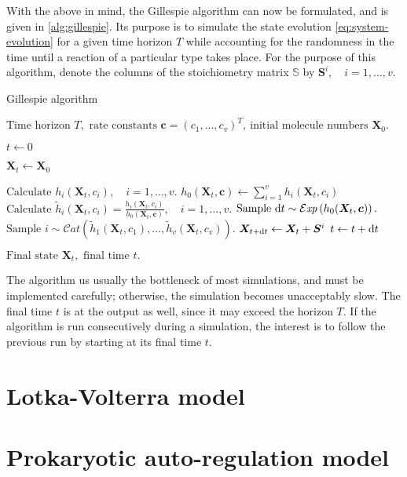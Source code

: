With the above in mind, the Gillespie algorithm can now be formulated, and is given in \autoref{alg:gillespie}. Its purpose is to simulate the state evolution \eqref{eq:system-evolution} for a given time horizon $T$ while accounting for the randomness in the time until a reaction of a particular type takes place. For the purpose of this algorithm, denote the columns of the stoichiometry matrix $\mathbb{S}$ by $\bm{S}^i, \quad i = 1, \ldots, v$.
\begin{algorithm}[ht]
    \caption{Gillespie algorithm}
    \label{alg:gillespie}
    \begin{algorithmic}[1]
        \Input $\text{Time horizon } T, \text{ rate constants } \bm{c} = \left(c_1, \ldots, c_v\right)^T,\ \text{initial molecule numbers } \bm{X}_0.$
        
        \State $t \gets 0$
        
        \State $\bm{X}_t \gets \bm{X}_0$
        
            \State $\text{Calculate } h_i(\bm{X}_t, c_i), \quad i = 1, \ldots, v.$
            \State $h_0(\bm{X}_t, \bm{c}) \gets \sum_{i=1}^v h_i(\bm{X}_t, c_i)$
            \State $\text{Calculate } \displaystyle \widetilde{h}_i(\bm{X}_t,c_i) = \frac{h_i(\bm{X}_t,c_i)}{h_0(\bm{X}_t, \bm{c})}, \quad i = 1, \ldots, v.$
            \State $\text{Sample } \mathrm{d}{t} \sim \mathcal{E}\mathit{xp}\left(h_0(\bm{X}_t, \bm{c})\right).$ 
            \State $\text{Sample } i \sim \mathcal{C}\mathit{at}\left(\widetilde{h}_1(\bm{X}_t,c_1), \ldots, \widetilde{h}_v(\bm{X}_t,c_v)\right).$ 
            \State $\bm{X}_{t + \mathrm{d}{t}} \gets \bm{X}_t + \bm{S}^i$ 
            \State $t \gets t + \mathrm{d}{t}$
        \EndWhile
        
        \Output $\text{Final state } \bm{X}_t, \text { final time } t.$
    \end{algorithmic}
\end{algorithm}
The algorithm us usually the bottleneck of most simulations, and must be implemented carefully; otherwise, the simulation becomes unacceptably slow. The final time $t$ is at the output as well, since it may exceed the horizon $T$. If the algorithm is run consecutively during a simulation, the interest is to follow the previous run by starting at its final time $t$.

\section{Lotka-Volterra model} \label{sec:lotka-volterra}

\section{Prokaryotic auto-regulation model} \label{sec:autoregulation}